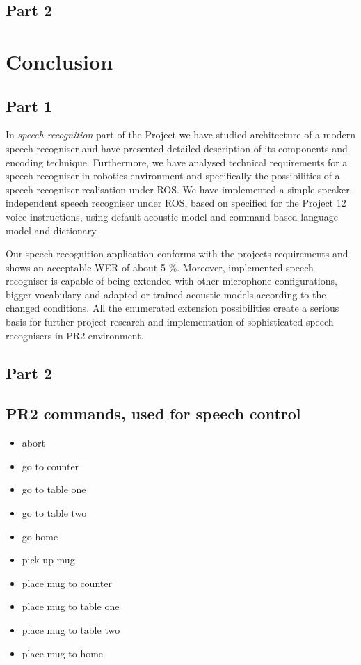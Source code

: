 \documentclass[11pt,a4paper]{report}
\begin{document}
\section {Part 2}

\chapter {Conclusion}
\label {sec:conclusion}

\section {Part 1}

In \textit {speech recognition} part of the Project we have
studied architecture of a modern speech recogniser and have presented detailed description of its
components and encoding technique.  Furthermore, we have analysed technical
requirements for a speech recogniser in robotics environment and  specifically
the possibilities of a speech recogniser realisation under ROS.
We have implemented a simple speaker-independent  speech recogniser under
ROS, based on specified for the Project 12 voice instructions, using default
acoustic model and command-based language model and dictionary. 

Our speech recognition application conforms with the projects
requirements and shows an acceptable WER of about 5 \%.  Moreover,
implemented speech recogniser is capable of being extended with other microphone
configurations, bigger vocabulary and adapted or trained acoustic
models according to the changed conditions. All the enumerated extension
possibilities create a serious basis for further project
research and implementation of sophisticated speech recognisers in PR2
environment.

\section {Part 2}

\begin{appendix}
\chapter {PR2 commands, used for speech control}
\label {app:commands}

\begin {itemize}
\item abort
\item go to counter
\item go to table one
\item go to table two 
\item go home
\item pick up mug 
\item place mug to counter
\item place mug to table one
\item place mug to table two
\item place mug to home
\end{itemize}

\end{appendix}

%


 
\end{document}
